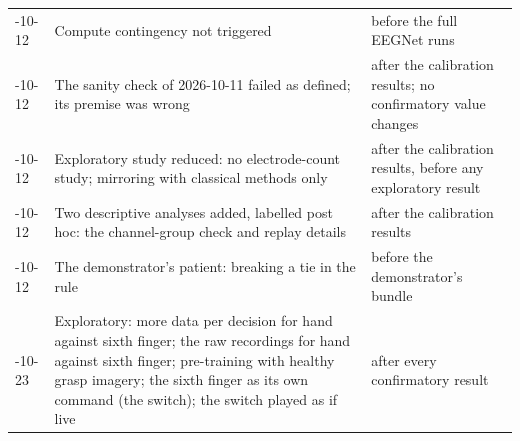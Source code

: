 \begin{table}[!htbp]
\begin{tabularx}{\textwidth}{>{\raggedright\arraybackslash}p{1.65cm}>{\raggedright\arraybackslash}X>{\raggedright\arraybackslash}p{3.6cm}}
2026-10-12 & Compute contingency not triggered & before the full EEGNet runs \\
2026-10-12 & The sanity check of 2026-10-11 failed as defined; its premise was wrong & after the calibration results; no confirmatory value changes \\
2026-10-12 & Exploratory study reduced: no electrode-count study; mirroring with classical methods only & after the calibration results, before any exploratory result \\
2026-10-12 & Two descriptive analyses added, labelled post hoc: the channel-group check and replay details & after the calibration results \\
2026-10-12 & The demonstrator's patient: breaking a tie in the rule & before the demonstrator's bundle \\
2026-10-23 & Exploratory: more data per decision for hand against sixth finger; the raw recordings for hand against sixth finger; pre-training with healthy grasp imagery; the sixth finger as its own command (the switch); the switch played as if live & after every confirmatory result \\
\bottomrule
\end{tabularx}
\end{table}
